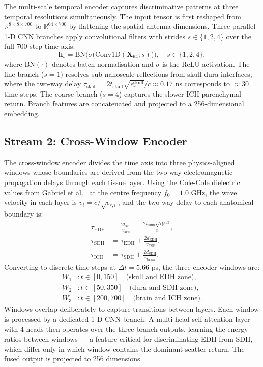 \documentclass[journal]{IEEEtran}
\begin{document}
The multi-scale temporal encoder captures discriminative
patterns at three temporal resolutions simultaneously.  The
input tensor is first reshaped from
$\mathbb{R}^{8\times 8 \times 700}$ to
$\mathbb{R}^{64 \times 700}$ by flattening the spatial
antenna dimensions.  Three parallel 1-D CNN branches apply
convolutional filters with strides $s \in \{1, 2, 4\}$ over
the full 700-step time axis:
\begin{equation}
  \mathbf{h}_s = \text{BN}\bigl(\sigma\bigl(
    \text{Conv1D}(\mathbf{X}_{64}; s)\bigr)\bigr),
  \quad s \in \{1, 2, 4\},
  \label{eq:mste}
\end{equation}
where $\text{BN}(\cdot)$ denotes batch normalisation
\cite{Ioffe2015} and $\sigma$ is the ReLU activation.
The fine branch ($s=1$) resolves sub-nanoscale reflections
from skull-dura interfaces, where the two-way delay
$\tau_\text{skull} = 2 t_\text{skull} \sqrt{\epsilon_r^\text{skull}} / c
\approx 0.17$ ns corresponds to $\approx 30$ time steps.
The coarse branch ($s=4$) captures the slower ICH
parenchymal return.  Branch features are concatenated and
projected to a 256-dimensional embedding.

\subsection{Stream 2: Cross-Window Encoder}

The cross-window encoder divides the time axis into three
physics-aligned windows whose boundaries are derived from the
two-way electromagnetic propagation delays through each tissue
layer.  Using the Cole-Cole dielectric values from
Gabriel et al.\ \cite{Gabriel1996} at the centre frequency
$f_0 = 1.0$ GHz, the wave velocity in each layer is
$v_i = c / \sqrt{\epsilon_{r,i}}$, and the two-way delay to
each anatomical boundary is:
\begin{align}
  \tau_{\text{EDH}} &= \frac{2 t_\text{skull}}{v_\text{skull}}
    = \frac{2 t_\text{skull} \sqrt{\epsilon_{r}^\text{skull}}}{c},
  \label{eq:tau_edh}\\
  \tau_{\text{SDH}} &= \tau_{\text{EDH}}
    + \frac{2 d_\text{EDH}}{v_\text{CSF}},
  \label{eq:tau_sdh}\\
  \tau_{\text{ICH}} &= \tau_{\text{SDH}}
    + \frac{2 d_\text{SDH}}{v_\text{brain}}.
  \label{eq:tau_ich}
\end{align}
Converting to discrete time steps at $\Delta t = 5.66$ ps,
the three encoder windows are:
\begin{align*}
  W_1 &: t \in [0, 150] \quad \text{(skull and EDH zone)},\\
  W_2 &: t \in [50, 350] \quad \text{(dura and SDH zone)},\\
  W_3 &: t \in [200, 700] \quad \text{(brain and ICH zone)}.
\end{align*}
Windows overlap deliberately to capture transitions between
layers.  Each window is processed by a dedicated 1-D CNN
branch.  A multi-head self-attention layer with 4 heads then
operates over the three branch outputs, learning the energy
ratios between windows --- a feature critical for
discriminating EDH from SDH, which differ only in which
window contains the dominant scatter return.  The fused
output is projected to 256 dimensions.
\end{document}
